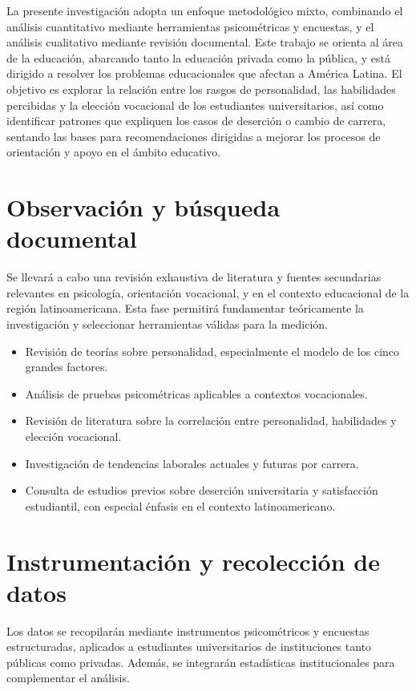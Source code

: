 La presente investigación adopta un enfoque metodológico mixto, combinando el análisis cuantitativo mediante herramientas psicométricas y encuestas, y el análisis cualitativo mediante revisión documental. Este trabajo se orienta al área de la educación, abarcando tanto la educación privada como la pública, y está dirigido a resolver los problemas educacionales que afectan a América Latina. El objetivo es explorar la relación entre los rasgos de personalidad, las habilidades percibidas y la elección vocacional de los estudiantes universitarios, así como identificar patrones que expliquen los casos de deserción o cambio de carrera, sentando las bases para recomendaciones dirigidas a mejorar los procesos de orientación y apoyo en el ámbito educativo.

\section{Observación y búsqueda documental}

Se llevará a cabo una revisión exhaustiva de literatura y fuentes secundarias relevantes en psicología, orientación vocacional, y en el contexto educacional de la región latinoamericana. Esta fase permitirá fundamentar teóricamente la investigación y seleccionar herramientas válidas para la medición.

\begin{itemize}
    \item Revisión de teorías sobre personalidad, especialmente el modelo de los cinco grandes factores.
    \item Análisis de pruebas psicométricas aplicables a contextos vocacionales.
    \item Revisión de literatura sobre la correlación entre personalidad, habilidades y elección vocacional.
    \item Investigación de tendencias laborales actuales y futuras por carrera.
    \item Consulta de estudios previos sobre deserción universitaria y satisfacción estudiantil, con especial énfasis en el contexto latinoamericano.
\end{itemize}

\section{Instrumentación y recolección de datos}

Los datos se recopilarán mediante instrumentos psicométricos y encuestas estructuradas, aplicados a estudiantes universitarios de instituciones tanto públicas como privadas. Además, se integrarán estadísticas institucionales para complementar el análisis.

